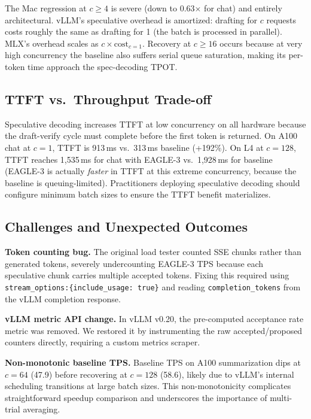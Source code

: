 \documentclass[10pt,twocolumn]{article}
\begin{document}
The Mac regression at $c \geq 4$ is severe (down to 0.63$\times$ for chat) and
entirely architectural.  vLLM's speculative overhead is amortized: drafting for
$c$ requests costs roughly the same as drafting for 1 (the batch is processed
in parallel).  MLX's overhead scales as $c \times \text{cost}_{c=1}$.  Recovery
at $c \geq 16$ occurs because at very high concurrency the baseline also suffers
serial queue saturation, making its per-token time approach the spec-decoding
TPOT.

\subsection{TTFT vs.\ Throughput Trade-off}

Speculative decoding increases TTFT at low concurrency on all hardware because
the draft-verify cycle must complete before the first token is returned.  On
A100 chat at $c=1$, TTFT is 913\,ms vs.\ 313\,ms baseline (+192\%).  On L4 at
$c=128$, TTFT reaches 1,535\,ms for chat with EAGLE-3 vs.\ 1,928\,ms for baseline
(EAGLE-3 is actually \emph{faster} in TTFT at this extreme concurrency, because
the baseline is queuing-limited).  Practitioners deploying speculative decoding
should configure minimum batch sizes to ensure the TTFT benefit materializes.

\subsection{Challenges and Unexpected Outcomes}

\textbf{Token counting bug.}  The original load tester counted SSE chunks rather
than generated tokens, severely undercounting EAGLE-3 TPS because each speculative
chunk carries multiple accepted tokens.  Fixing this required using
\texttt{stream\_options:\{include\_usage: true\}} and reading
\texttt{completion\_tokens} from the vLLM completion response.

\textbf{vLLM metric API change.}  In vLLM v0.20, the pre-computed acceptance rate
metric was removed.  We restored it by instrumenting the raw accepted/proposed
counters directly, requiring a custom metrics scraper.

\textbf{Non-monotonic baseline TPS.}  Baseline TPS on A100 summarization dips at
$c=64$ (47.9) before recovering at $c=128$ (58.6), likely due to vLLM's internal
scheduling transitions at large batch sizes.  This non-monotonicity complicates
straightforward speedup comparison and underscores the importance of multi-trial
averaging.
\end{document}
